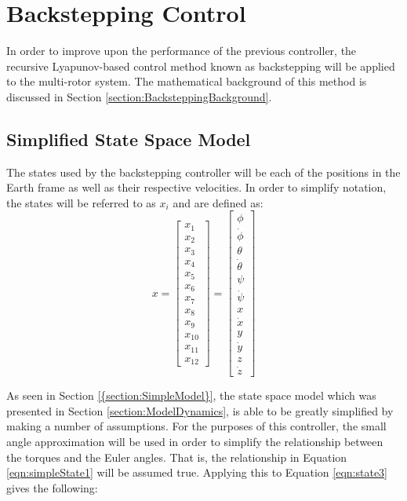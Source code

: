\FloatBarrier
\section{Backstepping Control}
In order to improve upon the performance of the previous controller, the recursive Lyapunov-based control method known as backstepping will be applied to the multi-rotor system. The mathematical background of this method is discussed in Section \ref{section:BacksteppingBackground}.
\subsection{Simplified State Space Model}
The states used by the backstepping controller will be each of the positions in the Earth frame as well as their respective velocities. In order to simplify notation, the states will be referred to as $x_{i}$ and are defined as:
\begin{equation}\label{eqn:stateDef}
x=
\begin{bmatrix}
x_{1}\\
x_{2}\\
x_{3}\\
x_{4}\\
x_{5}\\
x_{6}\\
x_{7}\\
x_{8}\\
x_{9}\\
x_{10}\\
x_{11}\\
x_{12}
\end{bmatrix}
=
\begin{bmatrix}
\phi\\
\dot{\phi}\\
\theta\\
\dot{\theta}\\
\psi\\
\dot{\psi}\\
x\\
\dot{x}\\
y\\
\dot{y}\\
z\\
\dot{z}
\end{bmatrix}
\end{equation}

As seen in Section \ref{{section:SimpleModel}}, the state space model which was presented in Section \ref{section:ModelDynamics}, is able to be greatly simplified by making a number of assumptions. For the purposes of this controller, the small angle approximation will be used in order to simplify the relationship between the torques and the Euler angles. That is, the relationship in Equation \ref{eqn:simpleState1} will be assumed true. Applying this to Equation \ref{eqn:state3} gives the following:

